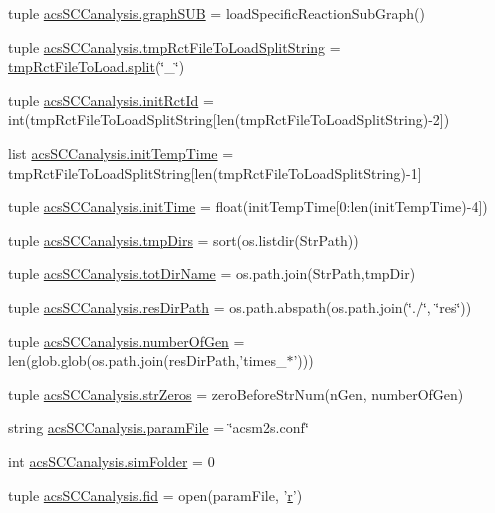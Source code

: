 \begin{DoxyCompactItemize}
\item 
tuple \hyperlink{a00130_ae307841da4a073fad4f6eaa172b0b970}{acs\+S\+C\+Canalysis.\+graph\+S\+U\+B} = load\+Specific\+Reaction\+Sub\+Graph()
\item 
tuple \hyperlink{a00130_add910e17b3f1fe61cdbaf8ce60ec0e20}{acs\+S\+C\+Canalysis.\+tmp\+Rct\+File\+To\+Load\+Split\+String} = \hyperlink{a00059_a4d1aa74fac80ae0275c056575fdb6626}{tmp\+Rct\+File\+To\+Load.\+split}(\char`\"{}\+\_\+\char`\"{})
\item 
tuple \hyperlink{a00130_a212643643fc6b002e8797f16633bb16d}{acs\+S\+C\+Canalysis.\+init\+Rct\+Id} = int(tmp\+Rct\+File\+To\+Load\+Split\+String\mbox{[}len(tmp\+Rct\+File\+To\+Load\+Split\+String)-\/2\mbox{]})
\item 
list \hyperlink{a00130_adc4403c4cfe080918c8b9da692c50509}{acs\+S\+C\+Canalysis.\+init\+Temp\+Time} = tmp\+Rct\+File\+To\+Load\+Split\+String\mbox{[}len(tmp\+Rct\+File\+To\+Load\+Split\+String)-\/1\mbox{]}
\item 
tuple \hyperlink{a00130_a826c1b0585b4e8474c76f92bd7583836}{acs\+S\+C\+Canalysis.\+init\+Time} = float(init\+Temp\+Time\mbox{[}0\+:len(init\+Temp\+Time)-\/4\mbox{]})
\item 
tuple \hyperlink{a00130_ace4c571efd2e5ecd266ce5701f761a83}{acs\+S\+C\+Canalysis.\+tmp\+Dirs} = sort(os.\+listdir(Str\+Path))
\item 
tuple \hyperlink{a00130_a5903034df3d32525785e697152efbeb3}{acs\+S\+C\+Canalysis.\+tot\+Dir\+Name} = os.\+path.\+join(Str\+Path,tmp\+Dir)
\item 
tuple \hyperlink{a00130_a9ededb3cd7c63befde39ad68e5f9e006}{acs\+S\+C\+Canalysis.\+res\+Dir\+Path} = os.\+path.\+abspath(os.\+path.\+join(\char`\"{}./\char`\"{}, \char`\"{}res\char`\"{}))
\item 
tuple \hyperlink{a00130_a9a81829f850e2e125e3c94214da7a1f0}{acs\+S\+C\+Canalysis.\+number\+Of\+Gen} = len(glob.\+glob(os.\+path.\+join(res\+Dir\+Path,'times\+\_\+$\ast$')))
\item 
tuple \hyperlink{a00130_a8ba6aefb71b3d1e575eac38627f143d6}{acs\+S\+C\+Canalysis.\+str\+Zeros} = zero\+Before\+Str\+Num(n\+Gen, number\+Of\+Gen)
\item 
string \hyperlink{a00130_a7160f8e48b4aafebbd75e9037fc9fef7}{acs\+S\+C\+Canalysis.\+param\+File} = \char`\"{}acsm2s.\+conf\char`\"{}
\item 
int \hyperlink{a00130_a58095f64afeda893517e81226e1963c3}{acs\+S\+C\+Canalysis.\+sim\+Folder} = 0
\item 
tuple \hyperlink{a00130_a424e2204e89264a827e6cad861ebcbc1}{acs\+S\+C\+Canalysis.\+fid} = open(param\+File, '\hyperlink{a00031_ac862e7284527eb913b1351c8bfb8e079}{r}')

\end{DoxyCompactItemize}

